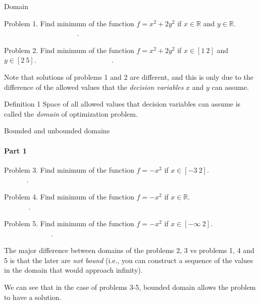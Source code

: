 \documentclass{beamer}
\begin{document}
\begin{frame}{Domain}
	\begin{flushleft}
		
		Problem 1. Find minimum of the function $f = x^2 + 2y^2$ if $x \in \mathbb{R}$ and $y \in \mathbb{R}$. \textcolor{white}{Solution is $x = 0$, $y = 0$}.
		
		\bigskip
		
		Problem 2. Find minimum of the function $f = x^2 + 2y^2$ if $x \in [1 \ 2]$ and $y \in [2 \ 5]$. \textcolor{white}{Solution is $x = 1$, $y = 2$}.
		
		\bigskip
		
		Note that solutions of problems 1 and 2 are different, and this is only due to the difference of the allowed values that the \emph{decision variables} $x$ and $y$ can assume.
		
		\begin{block}{Definition 1}
			Space of all allowed values that decision variables can assume is called the \emph{domain} of optimization problem.
		\end{block}
		
	\end{flushleft}
\end{frame}



\begin{frame}{Bounded and unbounded domains}
	\framesubtitle{Part 1}
	\begin{flushleft}
		
		Problem 3. Find minimum of the function $f = -x^2$ if $x \in [-3 \ 2]$. \textcolor{white}{Solution is $x = -3$}.
		
		\bigskip
		
		Problem 4. Find minimum of the function $f = -x^2$ if $x \in \mathbb{R}$. \textcolor{white}{The problem has no solution}.
		
		\bigskip
		
		Problem 5. Find minimum of the function $f = -x^2$ if $x \in  [-\infty \ 2]$. \textcolor{white}{The problem has no solution}.
		
		\bigskip
		
		The major difference between domains of the problems 2, 3 vs problems 1, 4 and 5 is that the later are \emph{not bound} (i.e., you can construct a sequence of the values in the domain that would approach infinity).
		
		\bigskip
		
		We can see that in the case of problems 3-5, bounded domain allows the problem to have a solution.
		
	\end{flushleft}
\end{frame}
\end{document}
